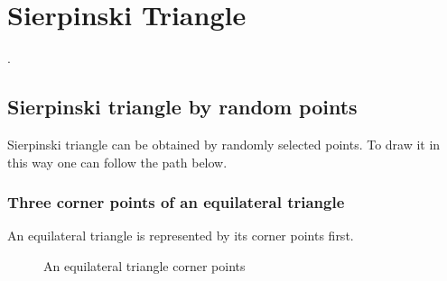 \section{Sierpinski Triangle}
\label{sec:SierpinskiTriangle}
\textcolor{gray}{
\lipsum[1-1]
}
\cite{sierpinskiWiki}.

\subsection{Sierpinski triangle by random points}
Sierpinski triangle can be obtained by randomly selected points. 
To draw it in this way one can follow the path below.

\subsubsection{Three corner points of an equilateral triangle}
An equilateral triangle is represented by its corner points first.
\begin{figure}[htb]
\centering
{}
\caption{An equilateral triangle corner points}
\label{fig:threePoints}
\end{figure}

